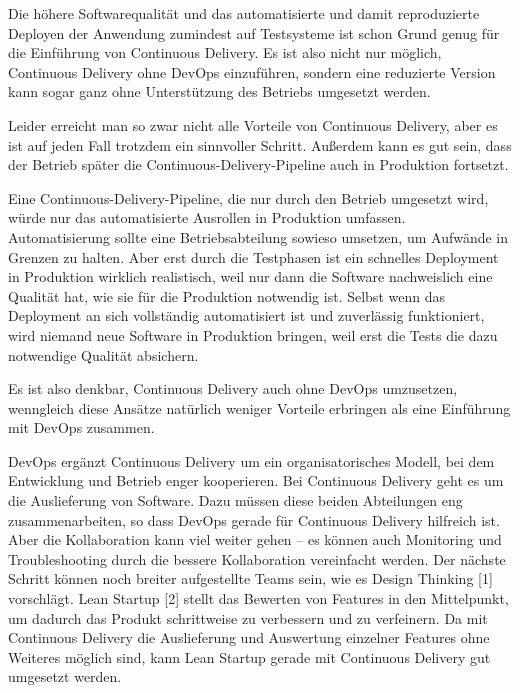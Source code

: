 Die höhere Softwarequalität und das automatisierte und damit reproduzierte Deployen der Anwendung zumindest auf Testsysteme ist schon Grund genug für die Einführung von Continuous Delivery. Es ist also nicht nur möglich, Continuous Delivery ohne DevOps einzuführen, sondern eine reduzierte Version kann sogar ganz ohne Unterstützung des Betriebs umgesetzt werden.

Leider erreicht man so zwar nicht alle Vorteile von Continuous Delivery, aber es ist auf jeden Fall trotzdem ein sinnvoller Schritt. Außerdem kann es gut sein, dass der Betrieb später die Continuous-Delivery-Pipeline auch in Produktion fortsetzt.

Eine Continuous-Delivery-Pipeline, die nur durch den Betrieb umgesetzt wird, würde nur das automatisierte Ausrollen in Produktion umfassen. Automatisierung sollte eine Betriebsabteilung sowieso umsetzen, um Aufwände in Grenzen zu halten. Aber erst durch die Testphasen ist ein schnelles Deployment in Produktion wirklich realistisch, weil nur dann die Software nachweislich eine Qualität hat, wie sie für die Produktion notwendig ist. Selbst wenn das Deployment an sich vollständig automatisiert ist und zuverlässig funktioniert, wird niemand neue Software in Produktion bringen, weil erst die Tests die dazu notwendige Qualität absichern.

Es ist also denkbar, Continuous Delivery auch ohne DevOps umzusetzen, wenngleich diese Ansätze natürlich weniger Vorteile erbringen als eine Einführung mit DevOps zusammen.


DevOps ergänzt Continuous Delivery um ein organisatorisches Modell, bei dem Entwicklung und Betrieb enger kooperieren. Bei Continuous Delivery geht es um die Auslieferung von Software. Dazu müssen diese beiden Abteilungen eng zusammenarbeiten, so dass DevOps gerade für Continuous Delivery hilfreich ist. Aber die Kollaboration kann viel weiter gehen – es können auch Monitoring und Troubleshooting durch die bessere Kollaboration vereinfacht werden. Der nächste Schritt können noch breiter aufgestellte Teams sein, wie es Design Thinking [1] vorschlägt. Lean Startup [2] stellt das Bewerten von Features in den Mittelpunkt, um dadurch das Produkt schrittweise zu verbessern und zu verfeinern. Da mit Continuous Delivery die Auslieferung und Auswertung einzelner Features ohne Weiteres möglich sind, kann Lean Startup gerade mit Continuous Delivery gut umgesetzt werden.



\ifCLASSOPTIONcaptionsoff
  \newpage
\fi